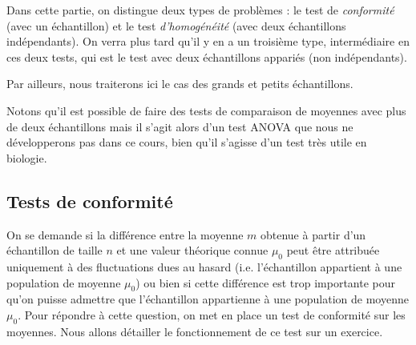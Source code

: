 \documentclass[12pt, a4paper]{book}
\numberwithin{equation}{section}
\begin{document}
Dans cette partie, on distingue deux types de problèmes : 
le test de {\it conformité} (avec un échantillon)
et le test {\it d'homogénéité} (avec deux échantillons indépendants).
On verra plus tard qu'il y en a un troisième type, intermédiaire en ces deux tests, qui est le test avec
deux échantillons appariés (non indépendants). 

Par ailleurs, nous traiterons ici le cas des grands et petits échantillons.

Notons qu'il est possible de faire des tests de comparaison
de moyennes avec plus de deux échantillons mais il s'agit alors d'un test ANOVA que nous ne développerons pas dans ce cours, bien qu'il s'agisse d'un test très utile en biologie. 

\subsection{Tests de conformité}
On se demande si la différence entre la moyenne  $m$
obtenue à partir d'un échantillon de taille $n$ et une valeur
théorique connue $\mu_0$ peut être attribuée uniquement à
des fluctuations dues au hasard (i.e. l'échantillon appartient
à une population de moyenne $\mu_0$) ou bien si cette
différence est trop importante pour qu'on puisse admettre que 
l'échantillon appartienne à une population de moyenne $\mu_0$.
Pour répondre à cette question, on met en place un test de conformité sur les moyennes.
Nous allons détailler le fonctionnement de ce test sur un exercice.\\

\end{document}
